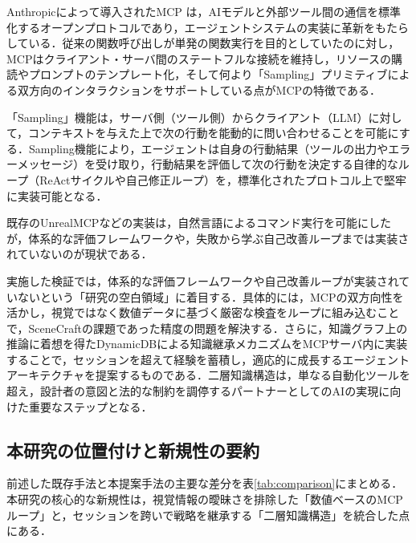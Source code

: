 \documentclass[dvipdfmx, a4paper, 9pt]{deimj}
\begin{document}
Anthropicによって導入されたMCP\cite{anthropic2024mcp} は，AIモデルと外部ツール間の通信を標準化するオープンプロトコルであり，エージェントシステムの実装に革新をもたらしている．従来の関数呼び出しが単発の関数実行を目的としていたのに対し\cite{schick2024toolformer}，MCPはクライアント・サーバ間のステートフルな接続を維持し，リソースの購読やプロンプトのテンプレート化，そして何より「Sampling」プリミティブによる双方向のインタラクションをサポートしている点がMCPの特徴である．

「Sampling」機能は，サーバ側（ツール側）からクライアント（LLM）に対して，コンテキストを与えた上で次の行動を能動的に問い合わせることを可能にする．Sampling機能により，エージェントは自身の行動結果（ツールの出力やエラーメッセージ）を受け取り，行動結果を評価して次の行動を決定する自律的なループ（ReActサイクル\cite{yao2023react}や自己修正ループ\cite{shinn2024reflexion,xi2023rise}）を，標準化されたプロトコル上で堅牢に実装可能となる．

既存のUnrealMCP\cite{unrealmcp2024}などの実装は，自然言語によるコマンド実行を可能にしたが，体系的な評価フレームワークや，失敗から学ぶ自己改善ループまでは実装されていないのが現状である．

実施した検証では，体系的な評価フレームワークや自己改善ループが実装されていないという「研究の空白領域」に着目する．具体的には，MCPの双方向性を活かし，視覚ではなく数値データに基づく厳密な検査をループに組み込むことで，SceneCraftの課題であった精度の問題を解決する．さらに，知識グラフ上の推論に着想を得たDynamicDBによる知識継承メカニズムをMCPサーバ内に実装することで，セッションを超えて経験を蓄積し，適応的に成長するエージェントアーキテクチャを提案するものである．二層知識構造は，単なる自動化ツールを超え，設計者の意図と法的な制約を調停するパートナーとしてのAIの実現に向けた重要なステップとなる．

\subsection{本研究の位置付けと新規性の要約}

前述した既存手法と本提案手法の主要な差分を表\ref{tab:comparison}にまとめる．本研究の核心的な新規性は，視覚情報の曖昧さを排除した「数値ベースのMCPループ」と，セッションを跨いで戦略を継承する「二層知識構造」を統合した点にある．
\end{document}

